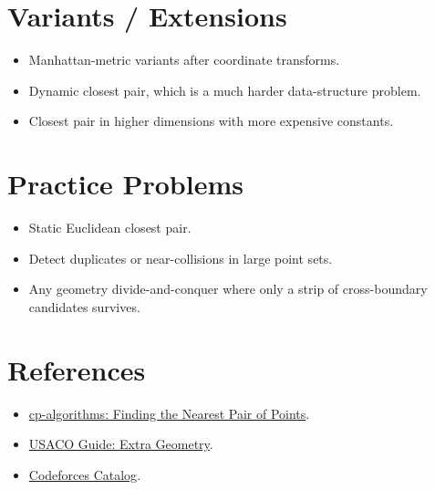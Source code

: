 \section*{Variants / Extensions}

\begin{itemize}
  \item Manhattan-metric variants after coordinate transforms.
  \item Dynamic closest pair, which is a much harder data-structure problem.
  \item Closest pair in higher dimensions with more expensive constants.
\end{itemize}

\section*{Practice Problems}

\begin{itemize}
  \item Static Euclidean closest pair.
  \item Detect duplicates or near-collisions in large point sets.
  \item Any geometry divide-and-conquer where only a strip of cross-boundary candidates survives.
\end{itemize}

\section*{References}

\begin{itemize}
  \item \href{https://cp-algorithms.com/geometry/nearest_points.html}{cp-algorithms: Finding the Nearest Pair of Points}.
  \item \href{https://usaco.guide/plat/geo-ext}{USACO Guide: Extra Geometry}.
  \item \href{https://codeforces.com/catalog}{Codeforces Catalog}.
\end{itemize}
